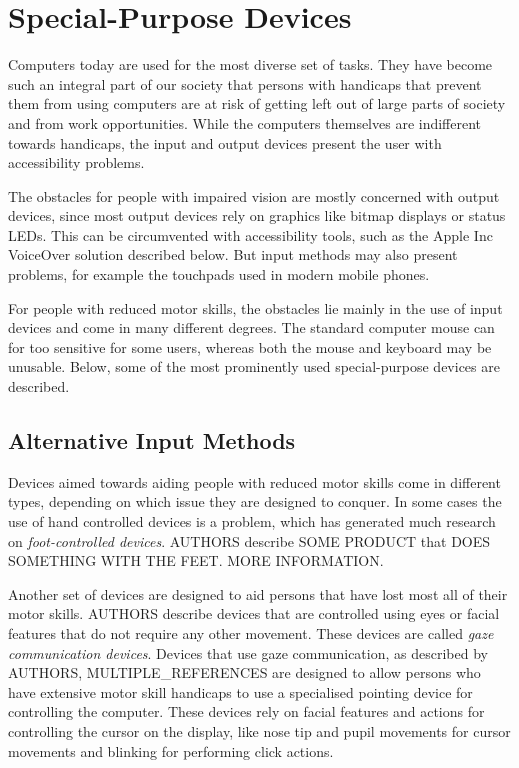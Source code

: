 \section{Special-Purpose Devices}

Computers today are used for the most diverse set of tasks. They have become such an integral part of our society that persons with handicaps that prevent them from using computers are at risk of getting left out of large parts of society and from work opportunities. While the computers themselves are indifferent towards handicaps, the input and output devices present the user with accessibility problems.

The obstacles for people with impaired vision are mostly concerned with output devices, since most output devices rely on graphics like bitmap displays or status LEDs. This can be circumvented with accessibility tools, such as the Apple Inc VoiceOver solution described below. But input methods may also present problems, for example the touchpads used in modern mobile phones.

For people with reduced motor skills, the obstacles lie mainly in the use of input devices and come in many different degrees. The standard computer mouse  can for too sensitive for some users, whereas both the mouse and keyboard may be unusable. Below, some of the most prominently used special-purpose devices are described.

\subsection{Alternative Input Methods}
Devices aimed towards aiding people with reduced motor skills come in different types, depending on which issue they are designed to conquer. In some cases the use of hand controlled devices is a problem, which has generated much research on \emph{foot-controlled devices}. AUTHORS describe SOME PRODUCT that DOES SOMETHING WITH THE FEET. MORE INFORMATION.


Another set of devices are designed to aid persons that have lost most all of their motor skills. AUTHORS describe devices that are controlled using eyes or facial features that do not require any other movement. These devices are called \emph{gaze communication devices}. Devices that use gaze communication, as described by AUTHORS, MULTIPLE\_REFERENCES are designed to allow persons who have extensive motor skill handicaps to use a specialised pointing device for controlling the computer. These devices rely on facial features and actions for controlling the cursor on the display, like nose tip and pupil movements for cursor movements and blinking for performing click actions.


